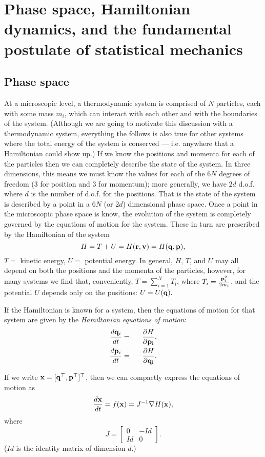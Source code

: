 \section{Phase space, Hamiltonian dynamics, and the fundamental postulate of statistical mechanics}


\subsection{Phase space}

At a microscopic level, a thermodynamic system is comprised of $N$ particles, each with some mass $m_i$, which can interact with each other and with the boundaries of the system. (Although we are going to motivate this discussion with a thermodynamic system, everything the follows is also true for other systems where the total energy of the system is conserved --- i.e. anywhere that a Hamiltonian could show up.) If we know the positions and momenta  for each of the particles then we can completely describe the state of the system. In three dimensions, this means we must know the values for each of the $6N$ degrees of freedom (3 for position and 3 for momentum); more generally, we have $2d$ d.o.f. where $d$ is the number of d.o.f. for the positions. That is the state of the system is described by a point in a $6N$ (or $2d$) dimensional phase space.
Once a point in the microscopic phase space is know, the evolution of the system is completely governed by the equations of motion for the system. These in turn are prescribed by the Hamiltonian of the system
$$H = T+U = H({\bf r}, {\bf v}) = H({\bf q}, {\bf p}),$$
$T=$ kinetic energy, $U=$ potential energy. In general, $H$, $T$, and $U$ may all depend on both the positions and the momenta of the particles, however, for many systems we find that, conveniently, $T = \sum_{i=1}^{N} T_i$, where $T_i=\frac{{\bf p}_i^2}{2m_i}$, and the potential $U$ depends only on the positions: $U = U({\bf q}).$

If the Hamiltonian is known for a system, then the equations of motion for that system are given by the \textit{Hamiltonian equations of motion}:
\begin{eqnarray*}
	\frac{d{\bf q}_i}{dt} &=& ~~\frac{\partial H}{\partial {\bf p_i}}, \\
	\frac{d{\bf p}_i}{dt} &=& -\frac{\partial H}{\partial {\bf q_i}}.
\end{eqnarray*}

If we write ${\bf x} = [{\bf q}^\top,{\bf p}^\top]^\top$, then we can compactly express the equations of motion as
\begin{equation}
	\frac{d{\bf x}}{dt} = f({\bf x}) = J^{-1}\nabla H({\bf x}),
\end{equation}
where
$$
	J = 
	\begin{bmatrix}
		0 & -Id\\
		Id & 0
	\end{bmatrix}.
$$
($Id$ is the identity matrix of dimension $d$.)

